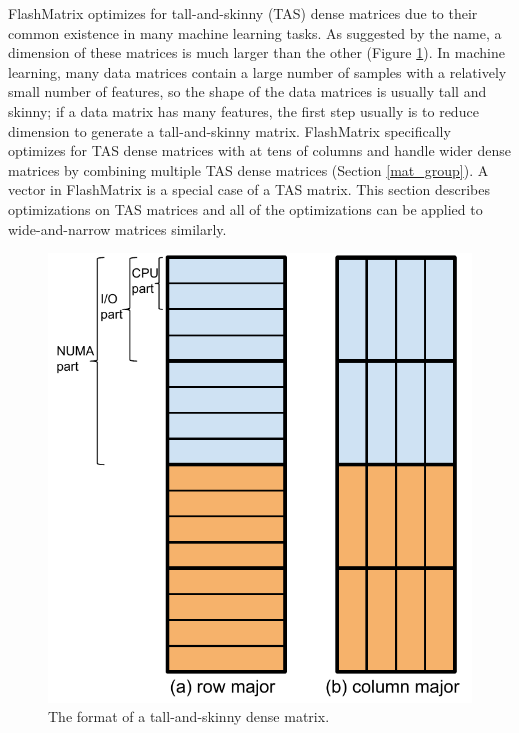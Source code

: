 FlashMatrix optimizes for tall-and-skinny (TAS) dense matrices due to their
common existence in many machine learning tasks. As suggested by the name,
a dimension of these matrices is much larger than the other (Figure \ref{fig:tas_mat}).
In machine learning, many data matrices contain a large number of samples with
a relatively small number of features, so the shape of the data matrices is
usually tall and skinny; if a data matrix has many features, the first step
usually is to reduce dimension to generate a tall-and-skinny matrix. FlashMatrix
specifically optimizes for TAS dense matrices with at tens of columns
and handle wider dense matrices by combining multiple TAS dense matrices
(Section \ref{mat_group}). A vector in FlashMatrix is a special case of a TAS
matrix. This section describes optimizations on TAS matrices and all of
the optimizations can be applied to wide-and-narrow matrices similarly.

\begin{figure}
	\centering
	\includegraphics[scale=0.5]{./dense_matrix.pdf}
	\caption{The format of a tall-and-skinny dense matrix.}
	\label{fig:tas_mat}
\end{figure}

